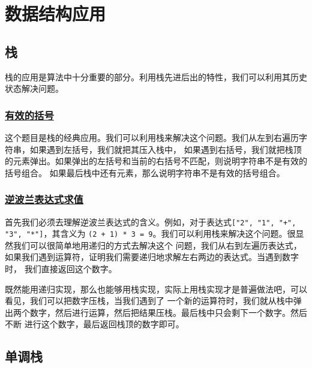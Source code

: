 \documentclass[../../main.tex]{subfiles}
\begin{document}
\setchapterpreamble[u]{\margintoc}

\chapter{数据结构应用}

\section{栈}

栈的应用是算法中十分重要的部分。利用栈先进后出的特性，我们可以利用其历史状态解决问题。

\subsection{\href{https://leetcode-cn.com/problems/valid-parentheses/}{有效的括号}}

这个题目是栈的经典应用。我们可以利用栈来解决这个问题。我们从左到右遍历字符串，如果遇到左括号，我们就把其压入栈中，
如果遇到右括号，我们就把栈顶的元素弹出。如果弹出的左括号和当前的右括号不匹配，则说明字符串不是有效的括号组合。
如果最后栈中还有元素，那么说明字符串不是有效的括号组合。



\subsection{\href{https://leetcode-cn.com/problems/evaluate-reverse-polish-notation/}{逆波兰表达式求值}}

首先我们必须去理解逆波兰表达式的含义。例如，对于表达式\texttt{["2", "1", "+", "3", "*"]}，其含义为
\texttt{(2 + 1) * 3 = 9}。我们可以利用栈来解决这个问题。很显然我们可以很简单地用递归的方式去解决这个
问题，我们从右到左遍历表达式，如果我们遇到运算符，证明我们需要递归地求解左右两边的表达式。当遇到数字时，
我们直接返回这个数字。



既然能用递归实现，那么也能够用栈实现，实际上用栈实现才是普遍做法吧，可以看见，我们可以把数字压栈，当我们遇到了
一个新的运算符时，我们就从栈中弹出两个数字，然后进行运算，然后把结果压栈。最后栈中只会剩下一个数字。然后不断
进行这个数字，最后返回栈顶的数字即可。



\section{单调栈}
\end{document}
